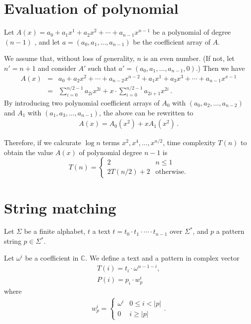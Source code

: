 \documentclass[11pt]{jarticle}
\begin{document}
\section{Evaluation of polynomial}

Let $A(x) = a_0 + a_1 x^1 + a_2 x^2 + \cdots + a_{n-1} x^{n-1}$ be a polynomial of degree $(n-1)$ , and 
let $a = (a_0, a_1, \ldots, a_{n-1})$ be the coefficient array of $A$. 

We assume that, without loss of generality, $n$ is an even number. 
(If not, let $n' = n + 1$ and consider $A'$ such that $a' = (a_0, a_1, \ldots, a_{n-1}, 0)$.)
Then we have
\begin{eqnarray*}
A(x) &=& a_0 + a_2 x^2 + \cdots + a_{n-2} x^{n-2}
+ a_1 x^1 + a_3 x^3 + \cdots +a_{n-1} x^{x-1} \\
&=& \sum_{i=0}^{n/2 - 1} a_{2i} x^{2i} + x \cdot\sum_{i=0}^{n/2 - 1} a_{2i+1} x^{2i} \,.
\end{eqnarray*}
By introducing two polynomial coefficient arrays of $A_0$ with $(a_0, a_2, \ldots, a_{n-2})$ and $A_1$ with $(a_1, a_3, \ldots, a_{n-1})$, the above can be rewritten to 
\begin{eqnarray*}
A(x) = A_0(x^2) + x A_1(x^2) \,.
\end{eqnarray*}

Therefore, if we calcurate $\log{n}$ terms $x^2, x^4, \ldots, x^{n/2}$, time complexity $T(n)$ to obtain the value $A(x)$ of polynomial degree $n-1$ is 
\[
T(n) =
\left\{\begin{array}{ll}
2 & n \leq 1 \\
2T(n/2) + 2 & \mbox{otherwise.}
\end{array}\right.
\]

\section{String matching}

Let $\Sigma$ be a finite alphabet, $t$ a text $t = t_0 \cdot t_1 \cdot \cdots\cdot t_{n-1}$ over $\Sigma^*$, 
and $p$ a pattern string $p \in \Sigma^*$. 

Let $\omega^{i}$ be a coefficient in $\mathbb{C}$. 
We define a text and a pattern in complex vector  
\begin{eqnarray*}
T(i) = t_i \cdot \omega^{n-1-i}, \\
P(i) = p_i \cdot w_p^{i}
\end{eqnarray*}
where 
\begin{eqnarray*}
w_p^i = \left\{\begin{array}{ll}
\omega^i & 0 \leq i < |p|\\
0 & i \geq |p|
\end{array}\right. .
\end{eqnarray*}
\end{document}
